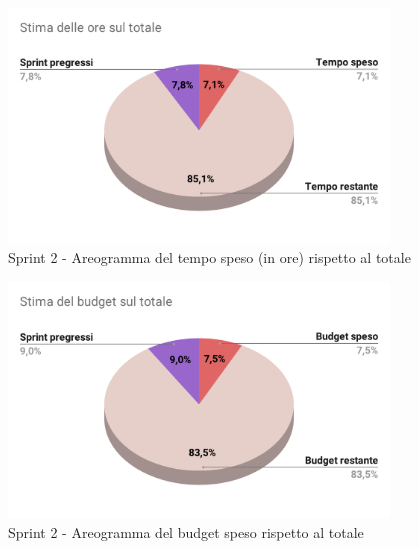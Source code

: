 \begin{figure}[H]
  \centering
  \includegraphics[width=0.90\textwidth]{assets/Consuntivo/Sprint-2/copertura_oraria.pdf}
  \caption{Sprint 2 - Areogramma del tempo speso (in ore) rispetto al totale}
\end{figure}

\begin{figure}[H]
  \centering
  \includegraphics[width=0.90\textwidth]{assets/Consuntivo/Sprint-2/budget_speso.pdf}
  \caption{Sprint 2 - Areogramma del budget speso rispetto al totale}
\end{figure}

